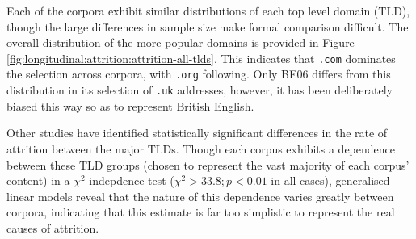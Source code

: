 Each of the corpora exhibit similar distributions of each top level domain (TLD), though the large differences in sample size make formal comparison difficult.  The overall distribution of the more popular domains is provided in Figure \ref{fig:longitudinal:attrition:attrition-all-tlds}.  This indicates that \texttt{.com} dominates the selection across corpora, with \texttt{.org} following.  Only BE06 differs from this distribution in its selection of \texttt{.uk} addresses, however, it has been deliberately biased this way so as to represent British English.


Other studies have identified statistically significant differences in the rate of attrition between the major TLDs.  
Though each corpus exhibits a dependence between these TLD groups (chosen to represent the vast majority of each corpus' content) in a $\chi^2$ indepdence test ($\chi^2 > 33.8; p<0.01$ in all cases), generalised linear models reveal that the nature of this dependence varies greatly between corpora, indicating that this estimate is far too simplistic to represent the real causes of attrition.






















